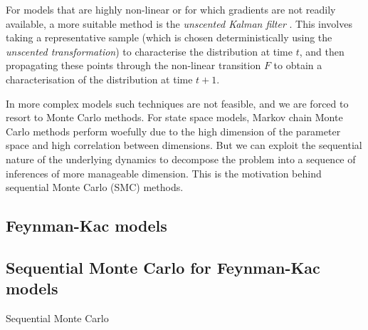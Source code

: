 For models that are highly non-linear or for which gradients are not readily available, a more suitable method is the \emph{unscented Kalman filter} \parencite{wan2000}. This involves taking a representative sample (which is chosen deterministically using the \emph{unscented transformation}) to characterise the distribution at time $t$, and then propagating these points through the non-linear transition $F$ to obtain a characterisation of the distribution at time $t+1$. 

In more complex models such techniques are not feasible, and we are forced to resort to Monte Carlo methods.
For state space models, Markov chain Monte Carlo methods perform woefully due to the high dimension of the parameter space and high correlation between dimensions. 
But we can exploit the sequential nature of the underlying dynamics to decompose the problem into a sequence of inferences of more manageable dimension.
This is the motivation behind sequential Monte Carlo (SMC) methods.


\subsection{Feynman-Kac models}

\subsection{Sequential Monte Carlo for Feynman-Kac models}

\vspace{10pt}
\begin{algorithm}
\DontPrintSemicolon
{}
\caption{Sequential Monte Carlo}\label{alg:SMC}
\end{algorithm}
\vspace{10pt}

